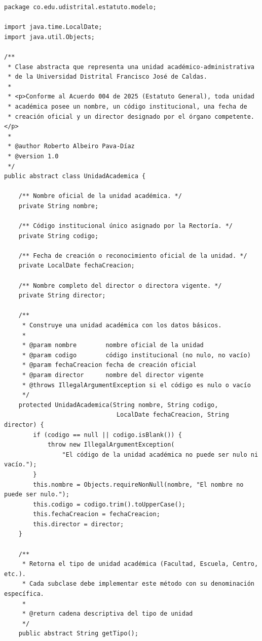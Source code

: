 \begin{lstlisting}[style=javaStyle, caption={Clase abstracta \texttt{UnidadAcademica}}, label={lst:unidad-academica}]
package co.edu.udistrital.estatuto.modelo;

import java.time.LocalDate;
import java.util.Objects;

/**
 * Clase abstracta que representa una unidad académico-administrativa
 * de la Universidad Distrital Francisco José de Caldas.
 *
 * <p>Conforme al Acuerdo 004 de 2025 (Estatuto General), toda unidad
 * académica posee un nombre, un código institucional, una fecha de
 * creación oficial y un director designado por el órgano competente.</p>
 *
 * @author Roberto Albeiro Pava-Díaz
 * @version 1.0
 */
public abstract class UnidadAcademica {

    /** Nombre oficial de la unidad académica. */
    private String nombre;

    /** Código institucional único asignado por la Rectoría. */
    private String codigo;

    /** Fecha de creación o reconocimiento oficial de la unidad. */
    private LocalDate fechaCreacion;

    /** Nombre completo del director o directora vigente. */
    private String director;

    /**
     * Construye una unidad académica con los datos básicos.
     *
     * @param nombre        nombre oficial de la unidad
     * @param codigo        código institucional (no nulo, no vacío)
     * @param fechaCreacion fecha de creación oficial
     * @param director      nombre del director vigente
     * @throws IllegalArgumentException si el código es nulo o vacío
     */
    protected UnidadAcademica(String nombre, String codigo,
                               LocalDate fechaCreacion, String director) {
        if (codigo == null || codigo.isBlank()) {
            throw new IllegalArgumentException(
                "El código de la unidad académica no puede ser nulo ni vacío.");
        }
        this.nombre = Objects.requireNonNull(nombre, "El nombre no puede ser nulo.");
        this.codigo = codigo.trim().toUpperCase();
        this.fechaCreacion = fechaCreacion;
        this.director = director;
    }

    /**
     * Retorna el tipo de unidad académica (Facultad, Escuela, Centro, etc.).
     * Cada subclase debe implementar este método con su denominación específica.
     *
     * @return cadena descriptiva del tipo de unidad
     */
    public abstract String getTipo();


\end{lstlisting}
